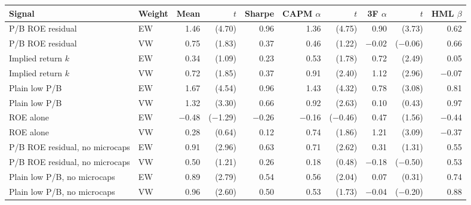 \begin{tabular}{llrrrrrrrr}
\toprule
Signal & Weight & Mean & $t$ & Sharpe & CAPM $\alpha$ & $t$ & 3F $\alpha$ & $t$ & HML $\beta$ \\
\midrule
P/B ROE residual & EW & 1.46 & (4.70) & 0.96 & 1.36 & (4.75) & 0.90 & (3.73) & 0.62 \\
P/B ROE residual & VW & 0.75 & (1.83) & 0.37 & 0.46 & (1.22) & \ensuremath{-}0.02 & (\ensuremath{-}0.06) & 0.66 \\
Implied return $k$ & EW & 0.34 & (1.09) & 0.23 & 0.53 & (1.78) & 0.72 & (2.49) & 0.05 \\
Implied return $k$ & VW & 0.72 & (1.85) & 0.37 & 0.91 & (2.40) & 1.12 & (2.96) & \ensuremath{-}0.07 \\
Plain low P/B & EW & 1.67 & (4.54) & 0.96 & 1.43 & (4.32) & 0.78 & (3.08) & 0.81 \\
Plain low P/B & VW & 1.32 & (3.30) & 0.66 & 0.92 & (2.63) & 0.10 & (0.43) & 0.97 \\
ROE alone & EW & \ensuremath{-}0.48 & (\ensuremath{-}1.29) & \ensuremath{-}0.26 & \ensuremath{-}0.16 & (\ensuremath{-}0.46) & 0.47 & (1.56) & \ensuremath{-}0.44 \\
ROE alone & VW & 0.28 & (0.64) & 0.12 & 0.74 & (1.86) & 1.21 & (3.09) & \ensuremath{-}0.37 \\
P/B ROE residual, no microcaps & EW & 0.91 & (2.96) & 0.63 & 0.71 & (2.62) & 0.31 & (1.31) & 0.55 \\
P/B ROE residual, no microcaps & VW & 0.50 & (1.21) & 0.26 & 0.18 & (0.48) & \ensuremath{-}0.18 & (\ensuremath{-}0.50) & 0.53 \\
Plain low P/B, no microcaps & EW & 0.89 & (2.79) & 0.54 & 0.56 & (2.04) & 0.07 & (0.31) & 0.74 \\
Plain low P/B, no microcaps & VW & 0.96 & (2.60) & 0.50 & 0.53 & (1.73) & \ensuremath{-}0.04 & (\ensuremath{-}0.20) & 0.88 \\
\bottomrule
\end{tabular}
